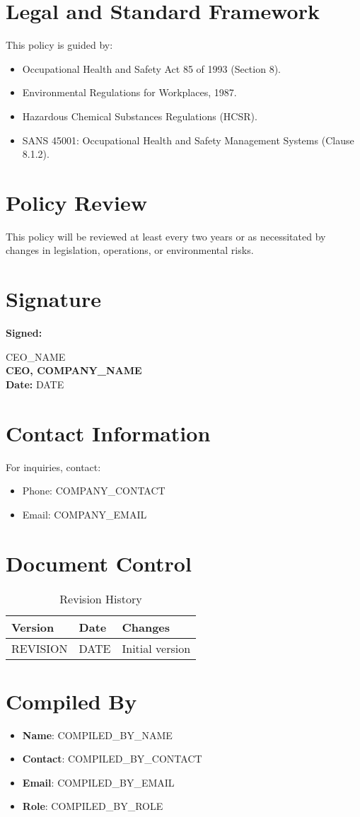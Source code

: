 \documentclass[12pt]{article}
\begin{document}
\section{Legal and Standard Framework}
This policy is guided by:
\begin{itemize}
    \item Occupational Health and Safety Act 85 of 1993 (Section 8).
    \item Environmental Regulations for Workplaces, 1987.
    \item Hazardous Chemical Substances Regulations (HCSR).
    \item SANS 45001: Occupational Health and Safety Management Systems (Clause 8.1.2).
\end{itemize}

\section{Policy Review}
This policy will be reviewed at least every two years or as necessitated by changes in legislation, operations, or environmental risks.

\section{Signature}
\textbf{Signed:}

{{CEO_NAME}}\\
\textbf{CEO, {{COMPANY_NAME}}}\\
\textbf{Date:} {{DATE}}

\section{Contact Information}
For inquiries, contact:
\begin{itemize}
    \item Phone: {{COMPANY_CONTACT}}
    \item Email: {{COMPANY_EMAIL}}
\end{itemize}

\section{Document Control}
\begin{table}[h]
    \centering
    \begin{tabular}{p{3cm}p{3cm}p{6cm}}
        \toprule
        \textbf{Version} & \textbf{Date} & \textbf{Changes} \\
        \midrule
        {{REVISION}} & {{DATE}} & Initial version \\
        \bottomrule
    \end{tabular}
    \caption{Revision History}
\end{table}

\section{Compiled By}
\begin{itemize}
    \item \textbf{Name}: {{COMPILED_BY_NAME}}
    \item \textbf{Contact}: {{COMPILED_BY_CONTACT}}
    \item \textbf{Email}: {{COMPILED_BY_EMAIL}}
    \item \textbf{Role}: {{COMPILED_BY_ROLE}}
\end{itemize}
\end{document}
